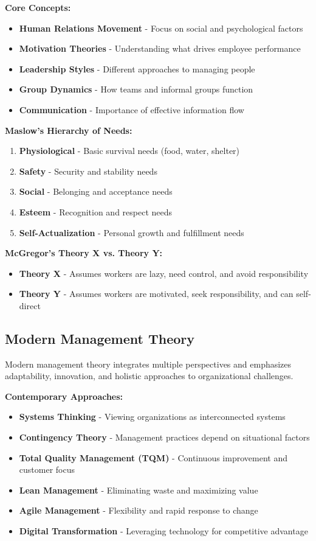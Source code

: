 \documentclass[12pt]{article}
\begin{document}
\textbf{Core Concepts:}
\begin{itemize}
    \item \textbf{Human Relations Movement} - Focus on social and psychological factors
    \item \textbf{Motivation Theories} - Understanding what drives employee performance
    \item \textbf{Leadership Styles} - Different approaches to managing people
    \item \textbf{Group Dynamics} - How teams and informal groups function
    \item \textbf{Communication} - Importance of effective information flow
\end{itemize}

\textbf{Maslow's Hierarchy of Needs:}
\begin{enumerate}
    \item \textbf{Physiological} - Basic survival needs (food, water, shelter)
    \item \textbf{Safety} - Security and stability needs
    \item \textbf{Social} - Belonging and acceptance needs
    \item \textbf{Esteem} - Recognition and respect needs
    \item \textbf{Self-Actualization} - Personal growth and fulfillment needs
\end{enumerate}

\textbf{McGregor's Theory X vs. Theory Y:}
\begin{itemize}
    \item \textbf{Theory X} - Assumes workers are lazy, need control, and avoid responsibility
    \item \textbf{Theory Y} - Assumes workers are motivated, seek responsibility, and can self-direct
\end{itemize}

\subsection{Modern Management Theory}
Modern management theory integrates multiple perspectives and emphasizes adaptability, innovation, and holistic approaches to organizational challenges.

\textbf{Contemporary Approaches:}
\begin{itemize}
    \item \textbf{Systems Thinking} - Viewing organizations as interconnected systems
    \item \textbf{Contingency Theory} - Management practices depend on situational factors
    \item \textbf{Total Quality Management (TQM)} - Continuous improvement and customer focus
    \item \textbf{Lean Management} - Eliminating waste and maximizing value
    \item \textbf{Agile Management} - Flexibility and rapid response to change
    \item \textbf{Digital Transformation} - Leveraging technology for competitive advantage
\end{itemize}
\end{document}
